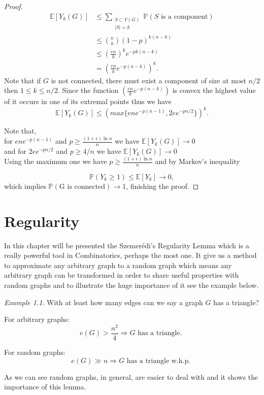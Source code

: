 \documentclass[12pt,twoside,a4paper]{book}
\numberwithin{equation}{section}
\let\log=\ln
\theoremstyle{remark}
\newtheorem{example}	[theorem] {Example}
\begin{document}
\begin{proof}
\begin{align*}
\mathbb{E}[Y_k (G)]  & \leq \sum_{\substack{S\subset V(G) \\ |S| = k}} \mathbb{P}(S\text{ is a component})\\
&\leq \binom{n}{k}(1-p)^{k(n-k)}\\
&\leq \left( \frac{en}{k} \right) ^k e^{-pk(n-k)}\\
& = \left( \frac{en}{k} e^{-p(n-k)} \right)^k.
\end{align*}
Note that if $G$ is not connected, there must exist a component of size at most $ n/2$ then $1 \leq k \leq n/2$. Since the function $\left( \frac{en}{k} e^{-p(n-k)} \right)$ is convex the highest value of it occurs in one of its extremal points thus we have
$$\mathbb{E}[Y_k (G)] \leq (max\{ene^{-p(n-1)}, 2ee^{-pn/2}\})^k .$$

Note that, \\
for $ene^{-p(n-1)}$ and $p \geq \frac{(1 + \epsilon) \log n}{n}$ we have $\mathbb{E}[Y_k (G)] \rightarrow 0$\\
and for $2ee^{-pn/2}$ and $p \geq 4/n$ we have $\mathbb{E}[Y_k (G)] \rightarrow 0$\\

Using the maximum one we have $p \geq \frac{(1 + \epsilon) \log n}{n}$  and by Markov's inequality

 $$\mathbb{P}(Y_k \geq 1) \leq \mathbb{E}[Y_k] \rightarrow 0,$$
 which implies $\mathbb{P}(\text{G is connected}) \rightarrow 1$, finishing the proof.

\end{proof}
\chapter{Regularity}
In this chapter will be presented the Szemerédi's Regularity Lemma which is a really powerful tool in Combinatorics,  perhaps the most one. It give us a method to approximate any arbitrary graph to a random graph which means any arbitrary graph can be transformed in order to share useful properties with random graphs and to illustrate the huge importance of it see the example below.

\begin{example}
With at least how many edges can we say a graph $G$ has a triangle?

For arbitrary graphs:
$$ e(G) > \frac{n^2}{4} \Rightarrow G \text{ has a triangle. }$$

For random graphs:
$$ e(G) \gg n \Rightarrow G\text{ has a triangle w.h.p. } $$

As we can see random graphs, in general, are easier to deal with and it shows the importance of this lemma.
\end{example}
\end{document}

